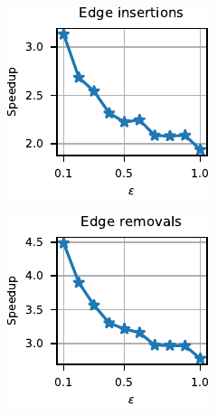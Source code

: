 \begin{figure}[t]
\centering
\begin{subfigure}[b]{.5\textwidth}
\begin{subfigure}[b]{.5\textwidth}
\centering
\includegraphics[width=.9\textwidth]{sources/plots/dyn-mwm/rw-insertion-road-speed.pdf}
\end{subfigure}\hfill
\begin{subfigure}[b]{.5\textwidth}
\centering
\includegraphics[width=.9\textwidth]{sources/plots/dyn-mwm/rw-removal-road-speed.pdf}

\end{subfigure}
\end{subfigure}
\end{figure}

